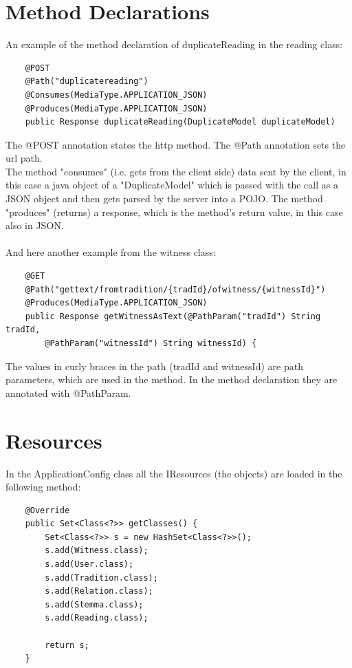\documentclass[11pt,fleqn,openany]{book} %
\begin{document}
\section*{Method Declarations}
An example of the method declaration of duplicateReading in the reading class:

\begin{lstlisting}
	@POST
	@Path("duplicatereading")
	@Consumes(MediaType.APPLICATION_JSON)
	@Produces(MediaType.APPLICATION_JSON)
	public Response duplicateReading(DuplicateModel duplicateModel)
\end{lstlisting}

The @POST annotation states the http method. The @Path annotation sets the url path.\\
The method "consumes" (i.e. gets from the client side) data sent by the client, in this case a java object of a "DuplicateModel" which is passed with the call as a JSON object and then gets parsed by the server into a POJO. The method "produces" (returns) a response, which is the method's return value, in this case also in JSON. 
\\\\
And here another example from the witness class:

\begin{lstlisting}
	@GET
	@Path("gettext/fromtradition/{tradId}/ofwitness/{witnessId}")
	@Produces(MediaType.APPLICATION_JSON)
	public Response getWitnessAsText(@PathParam("tradId") String tradId,
		@PathParam("witnessId") String witnessId) {
\end{lstlisting}

The values in curly braces in the path (tradId and witnessId) are path parameters, which are used in the method. In the method declaration they are annotated with @PathParam. 

\section*{Resources}
In the ApplicationConfig class all the IResources (the objects) are loaded in the following method:

\begin{lstlisting}
	@Override
	public Set<Class<?>> getClasses() {
		Set<Class<?>> s = new HashSet<Class<?>>();
		s.add(Witness.class);
		s.add(User.class);
		s.add(Tradition.class);
		s.add(Relation.class);
		s.add(Stemma.class);
		s.add(Reading.class);
		
		return s;
	}
\end{lstlisting}
\end{document}
